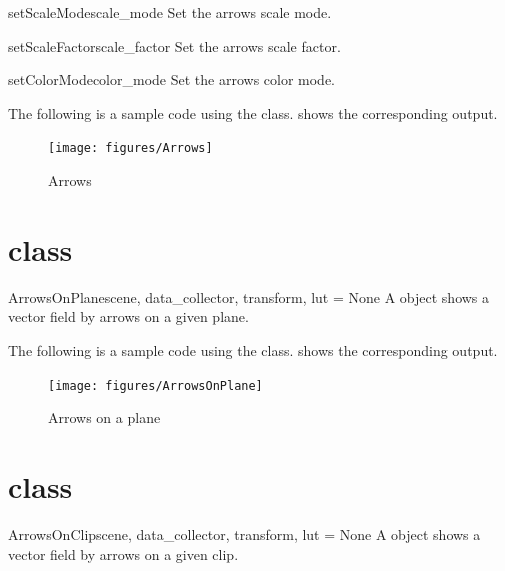 \begin{methoddesc}[Arrows]{setScaleMode}{scale_mode}
Set the arrows scale mode.
\end{methoddesc}

\begin{methoddesc}[Arrows]{setScaleFactor}{scale_factor}
Set the arrows scale factor.
\end{methoddesc}

\begin{methoddesc}[Arrows]{setColorMode}{color_mode}
Set the arrows color mode.
\end{methoddesc}

The following is a sample code using the \Arrows class. 
 shows the corresponding output. 


\begin{figure}[ht]
\begin{center}
\texttt{[image: figures/Arrows]}
\end{center}
\caption{Arrows}
\label{fig:arrows.1}
\end{figure}

\section{\ArrowsOnPlane class}
\begin{classdesc}{ArrowsOnPlane}{scene, data_collector, transform, lut = None}
A \ArrowsOnPlane object shows a vector field by arrows on a given plane.
\end{classdesc}

The following is a sample code using the \ArrowsOnPlane class. 
 shows the corresponding output. 


\begin{figure}[ht]
\begin{center}
\texttt{[image: figures/ArrowsOnPlane]}
\end{center}
\caption{Arrows on a plane}
\label{fig:arrowsonplane.1}
\end{figure}

\section{\ArrowsOnClip class}
\begin{classdesc}{ArrowsOnClip}{scene, data_collector, transform, lut = None}
A \ArrowsOnClip object shows a vector field by arrows on a given clip.
\end{classdesc}


